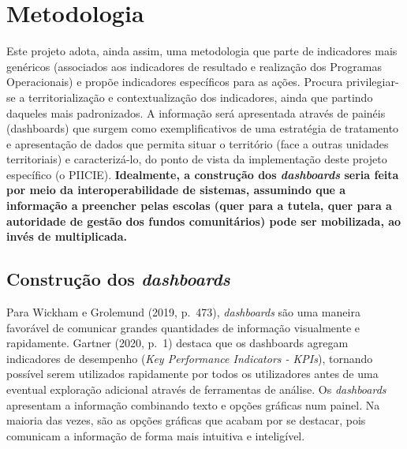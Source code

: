 \documentclass[
]{book}
\begin{document}
\hypertarget{metodologia}{%
\section{\texorpdfstring{\textbf{Metodologia}}{Metodologia}}\label{metodologia}}

Este projeto adota, ainda assim, uma metodologia que parte de indicadores mais genéricos (associados aos indicadores de resultado e realização dos Programas Operacionais) e propõe indicadores específicos para as ações. Procura privilegiar-se a territorialização e contextualização dos indicadores, ainda que partindo daqueles mais padronizados. A informação será apresentada através de painéis (dashboards) que surgem como exemplificativos de uma estratégia de tratamento e apresentação de dados que permita situar o território (face a outras unidades territoriais) e caracterizá-lo, do ponto de vista da implementação deste projeto específico (o PIICIE). \textbf{Idealmente, a construção dos \emph{dashboards} seria feita por meio da interoperabilidade de sistemas, assumindo que a informação a preencher pelas escolas (quer para a tutela, quer para a autoridade de gestão dos fundos comunitários) pode ser mobilizada, ao invés de multiplicada.}

\hypertarget{construuxe7uxe3o-dos-dashboards}{%
\subsection{\texorpdfstring{\textbf{Construção dos \emph{dashboards} }}{Construção dos dashboards }}\label{construuxe7uxe3o-dos-dashboards}}

Para Wickham e Grolemund (2019, p.~473), \emph{dashboards} são uma maneira favorável de comunicar grandes quantidades de informação visualmente e rapidamente. Gartner (2020, p.~1) destaca que os dashboards agregam indicadores de desempenho (\emph{Key Performance Indicators - KPIs}), tornando possível serem utilizados rapidamente por todos os utilizadores antes de uma eventual exploração adicional através de ferramentas de análise. Os \emph{dashboards} apresentam a informação combinando texto e opções gráficas num painel. Na maioria das vezes, são as opções gráficas que acabam por se destacar, pois comunicam a informação de forma mais intuitiva e inteligível.
\end{document}
